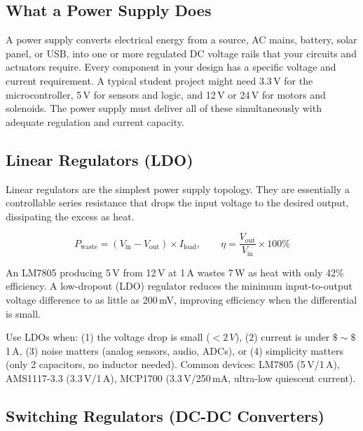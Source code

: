 \documentclass[11pt,letterpaper,twoside,openany]{book}
\begin{document}
\subsection{What a Power Supply Does}

A power supply converts electrical energy from a source, AC mains, battery, solar panel, or USB, into one or more regulated DC voltage rails that your circuits and actuators require. Every component in your design has a specific voltage and current requirement. A typical student project might need 3.3\,V for the microcontroller, 5\,V for sensors and logic, and 12\,V or 24\,V for motors and solenoids. The power supply must deliver all of these simultaneously with adequate regulation and current capacity.

\subsection{Linear Regulators (LDO)}

Linear regulators are the simplest power supply topology. They are essentially a controllable series resistance that drops the input voltage to the desired output, dissipating the excess as heat.

\begin{equation}
  P_{\text{waste}} = (V_{\text{in}} - V_{\text{out}}) \times I_{\text{load}}, \qquad \eta = \frac{V_{\text{out}}}{V_{\text{in}}} \times 100\%
\end{equation}

An LM7805 producing 5\,V from 12\,V at 1\,A wastes 7\,W as heat with only 42\% efficiency. A low-dropout (LDO) regulator reduces the minimum input-to-output voltage difference to as little as 200\,mV, improving efficiency when the differential is small.

\begin{tipbox}
Use LDOs when: (1) the voltage drop is small ($<2\,V$), (2) current is under $\$\sim\$$1\,A, (3) noise matters (analog sensors, audio, ADCs), or (4) simplicity matters (only 2 capacitors, no inductor needed). Common devices: LM7805 (5\,V/1\,A), AMS1117-3.3 (3.3\,V/1\,A), MCP1700 (3.3\,V/250\,mA, ultra-low quiescent current).
\end{tipbox}

\subsection{Switching Regulators (DC-DC Converters)}
\end{document}
